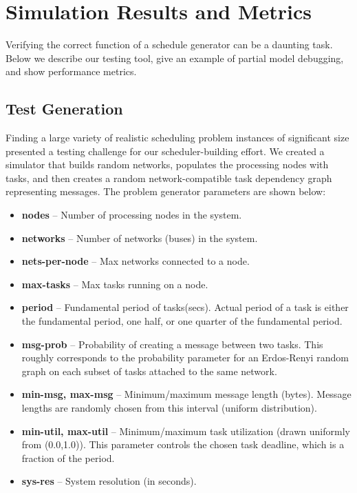 \section{Simulation Results and Metrics}
\label{simulation}

Verifying the correct function of a schedule generator can be a daunting task.  Below we describe our testing tool, give an example of partial model debugging, and show performance metrics.

\subsection{Test Generation}

Finding a large variety of realistic scheduling problem instances of significant size presented a testing challenge for our scheduler-building effort.  We created a simulator that builds random networks, populates the processing nodes with tasks, and then creates a random network-compatible task dependency graph representing messages.  The problem generator parameters are shown below:

\begin{itemize}
\item {\bf nodes} -- Number of processing nodes in the system.
\item {\bf networks} -- Number of networks (buses) in the system.
\item {\bf nets-per-node} -- Max networks connected to a node.
\item {\bf max-tasks} -- Max tasks running on a node.
\item {\bf period} -- Fundamental period of tasks(secs).  Actual period of a task is either the fundamental period, one half, or one quarter of the fundamental period.
\item {\bf msg-prob} -- Probability of creating a message between two tasks.  This roughly corresponds to the probability parameter for an Erdos-Renyi random graph on each subset of tasks attached to the same network.
\item {\bf min-msg, max-msg} -- Minimum/maximum message length (bytes).  Message lengths are randomly chosen from this interval (uniform distribution).
\item {\bf min-util, max-util} -- Minimum/maximum task utilization (drawn uniformly from (0.0,1.0)).  This parameter controls the chosen task deadline, which is a fraction of the period.
\item {\bf sys-res} -- System resolution (in seconds).
\end{itemize}


